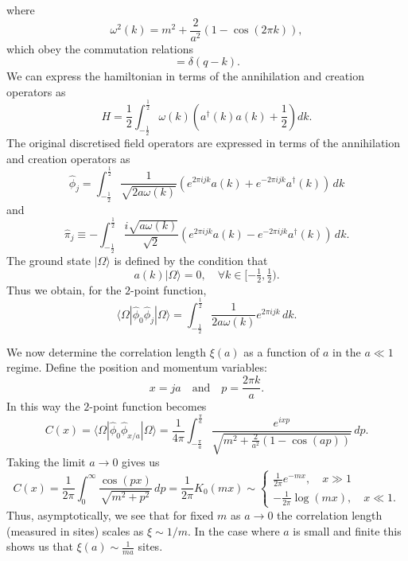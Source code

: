 \documentclass[prl,twocolumn,lengthcheck,superscriptaddress]{revtex4-1}
\theoremstyle{definition}
\theoremstyle{remark}
\begin{document}
where 
\begin{equation}
	\omega^2(k) = m^2 + \frac{2}{a^2}\left(1-\cos\left(2\pi k\right)\right),
\end{equation}
 which obey the commutation relations
\begin{equation}
	[a(k), a^\dag(q)] = \delta(q-k).
\end{equation}
We can express the hamiltonian in terms of the annihilation and creation operators as
\begin{equation}
	H = \frac12\int_{-\frac{1}{2}}^{\frac{1}{2}} \omega(k)\left(a^\dag(k)a(k) + \frac12\right) dk.
\end{equation}
The original discretised field operators are expressed in terms of the annihilation and creation operators as 
\begin{equation}
	\widehat{\phi}_j = \int_{-\frac{1}{2}}^{\frac{1}{2}} \frac{1}{\sqrt{2a\omega(k)}}\left(e^{2\pi ijk} a(k)+e^{-2\pi ijk} a^\dag(k)\right)\,dk
\end{equation}
and
\begin{equation}
	\widehat{\pi}_j \equiv -\int_{-\frac{1}{2}}^{\frac{1}{2}} \frac{i\sqrt{a\omega(k)}}{\sqrt{2}}\left(e^{2\pi ijk}a(k) - e^{-2\pi ijk}a^\dag(k)\right)\,dk.
\end{equation}
The ground state $|\Omega\rangle$ is defined by the condition that 
\begin{equation}
	a(k)|\Omega\rangle = 0, \quad \forall k\in [-\tfrac12,\tfrac12).
\end{equation}
Thus we obtain, for the $2$-point function,
\begin{equation}
	\langle \Omega|\widehat{\phi}_0\widehat{\phi}_j |\Omega\rangle = \int_{-\frac{1}{2}}^{\frac{1}{2}} \frac{1}{2a\omega(k)} e^{2\pi i jk}\,dk.
\end{equation}

We now determine the correlation length $\xi(a)$ as a function of $a$ in the $a \ll 1$ regime. Define the position and momentum variables:
\begin{equation}
	x = ja \quad\text{and}\quad p = \frac{2\pi k}{a}.
\end{equation}
In this way the $2$-point function becomes
\begin{equation}
	C(x) = \langle \Omega|\widehat{\phi}_0\widehat{\phi}_{x/a} |\Omega\rangle = \frac{1}{4\pi}\int_{-\frac{\pi}{a}}^{\frac{\pi}{a}} \frac{e^{i xp}}{\sqrt{m^2 + \frac{2}{a^2}\left(1-\cos(ap)\right)}} \,dp.
\end{equation}
Taking the limit $a\rightarrow 0$ gives us
\begin{equation}
	C(x) = \frac{1}{2\pi}\int_0^\infty \frac{\cos( p x)}{\sqrt{m^2 + p^2}} \, dp = \frac{1}{2\pi}K_0(m x) \sim \begin{cases}\frac{1}{2\pi}e^{-mx}, \quad x \gg 1 \\
	-\frac{1}{2\pi} \log(mx), \quad x \ll 1.\end{cases}
\end{equation}
Thus, asymptotically, we see that for fixed $m$ as $a\rightarrow 0$ the correlation length (measured in sites) scales as $\xi \sim 1/m$. In the case where $a$ is small and finite this shows us that $\xi(a) \sim \frac{1}{ma}$ sites.
\end{document}
